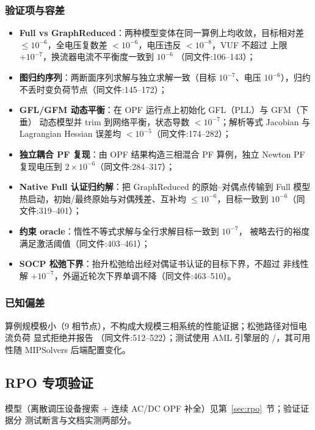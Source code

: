 \subsubsection*{验证项与容差}
\begin{itemize}
  \item \textbf{Full vs GraphReduced}：两种模型变体在同一算例上均收敛，目标相对差
        $\le10^{-6}$，全电压复数差 $<10^{-6}$，电压违反 $<10^{-8}$，VUF 不超过
        上限 $+10^{-7}$，换流器电流不平衡度一致到 $10^{-6}$
        （同文件:106--143）；
  \item \textbf{图归约序列}：两断面序列求解与独立求解一致（目标 $10^{-7}$、电压
        $10^{-6}$），归约不丢时变负荷节点（同文件:145--172）；
  \item \textbf{GFL/GFM 动态平衡}：在 OPF 运行点上初始化 GFL（PLL）与 GFM（下垂）
        动态模型并 trim 到网络平衡，状态导数 $<10^{-7}$；解析等式 Jacobian 与
        Lagrangian Hessian 误差均 $<10^{-5}$（同文件:174--282）；
  \item \textbf{独立耦合 PF 复现}：由 OPF 结果构造三相混合 PF 算例，独立 Newton
        PF 复现电压到 $2\times10^{-6}$（同文件:284--317）；
  \item \textbf{Native Full 认证归约解}：把 GraphReduced 的原始--对偶点传输到 Full
        模型热启动，初始/最终原始与对偶残差、互补均 $\le10^{-6}$，目标一致到
        $10^{-6}$（同文件:319--401）；
  \item \textbf{约束 oracle}：惰性不等式求解与全行求解目标一致到 $10^{-7}$，
        被略去行的裕度满足激活阈值（同文件:403--461）；
  \item \textbf{SOCP 松弛下界}：抬升松弛给出经对偶证书认证的目标下界，不超过
        非线性解 $+10^{-7}$，外逼近轮次下界单调不降（同文件:463--510）。
\end{itemize}

\subsubsection*{已知偏差}
算例规模极小（9 相节点），不构成大规模三相系统的性能证据；松弛路径对恒电流负荷
显式拒绝并报告 （同文件:512--522）；测试使用 AML 引擎层的
/，其可用性随 MIPSolvers 后端配置变化。


\subsection{RPO 专项验证}\label{subsec:ver:rpo}

模型（离散调压设备搜索 + 连续 AC/DC OPF 补全）见第~\ref{sec:rpo}~节；验证证据分
测试断言与文档实测两部分。

